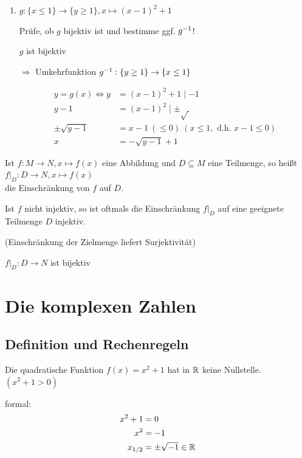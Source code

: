 \begin{enumerate}
	\clearpage
	\item $g:\{x\le 1\} \to \{y\ge 1\} , x\mapsto (x-1)^2+1$
	
	Prüfe, ob $g$ bijektiv ist und bestimme ggf. ${g}^{-1}$!
	
	
	$g$ ist bijektiv
	
	$\Rightarrow$ Umkehrfunktion ${g}^{-1}:\{y\ge 1\}\to\{x\le 1\}$
	
	\begin{align*}
		y=g(x) \Leftrightarrow y&=(x-1)^2+1\mid -1\\
		y-1 &= (x-1)^2\mid \pm\sqrt{\ }\\
		\pm\sqrt{y-1} &= x-1\ (\le 0)\ (x \le 1,\text{ d.h. }x-1 \le 0)\\
		x &= -\sqrt{y-1}+1
	\end{align*}
\end{enumerate}

\clearpage
\Def Ist $f:M\to N, x \mapsto f(x)$ eine Abbildung und $D\subseteq M$ eine Teilmenge, so heißt\\
${f|}_{D}:D\to N, x\mapsto f(x)$\\
die Einschränkung von $f$ auf $D$.

\Bem Ist $f$ nicht injektiv, so ist oftmals die Einschränkung ${f|}_{D}$ auf eine geeignete Teilmenge $D$ injektiv.

(Einschränkung der Zielmenge {\flqq liefert Surjektivität\frqq})

\Bsp 


${f|}_{D} :D\to N$ ist bijektiv


\clearpage
\chapter{Die komplexen Zahlen}

\section{Definition und Rechenregeln}

\Problem Die quadratische Funktion $f(x)=x^2 +1$ hat in $\mathbb{R}$ keine Nullstelle.\\$(x^2+1>0)$

formal:
\begin{align*}
	x^2+1 &= 0\\
	x^2 &= -1\\
	x_{1/2} &= \pm\sqrt{-1}\in \mathbb{R}
\end{align*}

